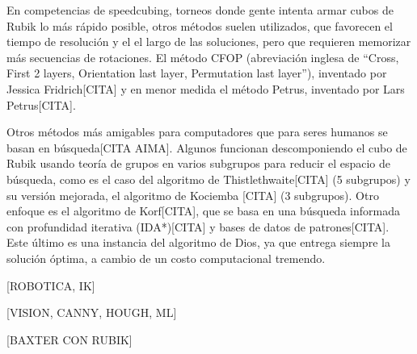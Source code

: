 En competencias de speedcubing, torneos donde gente intenta armar cubos de Rubik lo más rápido posible, otros métodos suelen utilizados, que favorecen el tiempo de resolución y el el largo de las soluciones, pero que requieren memorizar más secuencias de rotaciones. El método CFOP (abreviación inglesa de ``Cross, First 2 layers, Orientation last layer, Permutation last layer''), inventado por Jessica Fridrich[CITA] y en menor medida el método Petrus, inventado por Lars Petrus[CITA].

Otros métodos más amigables para computadores que para seres humanos se basan en búsqueda[CITA AIMA]. Algunos funcionan descomponiendo el cubo de Rubik usando teoría de grupos en varios subgrupos para reducir el espacio de búsqueda, como es el caso del algoritmo de Thistlethwaite[CITA] (5 subgrupos) y su versión mejorada, el algoritmo de Kociemba [CITA] (3 subgrupos). Otro enfoque es el algoritmo de Korf[CITA], que se basa en una búsqueda informada con profundidad iterativa (IDA*)[CITA] y bases de datos de patrones[CITA]. Este último es una instancia del algoritmo de Dios, ya que entrega siempre la solución óptima, a cambio de un costo computacional tremendo.

[ROBOTICA, IK]

[VISION, CANNY, HOUGH, ML]

[BAXTER CON RUBIK]
